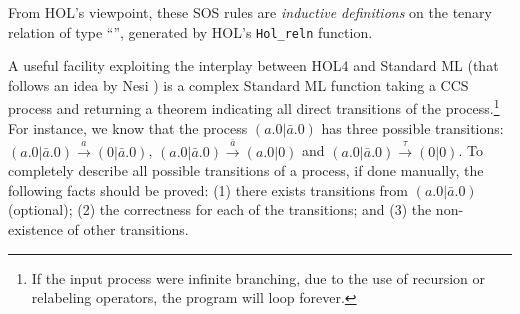From HOL's viewpoint, these
SOS rules are \emph{inductive 
  definitions} on the tenary relation  of type ``'', generated by HOL's 
\texttt{Hol_reln} function.

A useful facility exploiting the interplay
between HOL4 and Standard ML (that follows an idea by Nesi \cite{Nesi:1992ve})
 is a complex Standard ML function
  taking a CCS process and returning a theorem indicating all
  direct transitions of the process.\footnote{If the input process were
 infinite branching, due to the use of recursion or
    relabeling operators, the program will loop forever.}
For instance, we know that the process $(a.0 | \bar{a}.0)$ has three
possible transitions: $(a.0 | \bar{a}.0) \overset{a}{\longrightarrow}
(0 | \bar{a}.0)$, $(a.0 | \bar{a}.0)
\overset{\bar{a}}{\longrightarrow} (a.0 | 0)$ and $(a.0 | \bar{a}.0)
\overset{\tau}{\longrightarrow} (0 | 0)$.
To completely describe all possible transitions of a process, if done manually, the
following facts should be proved: (1) there exists transitions from
$(a.0 | \bar{a}.0)$ (optional); (2) the correctness for each of the
transitions; and (3) the non-existence of other transitions.


